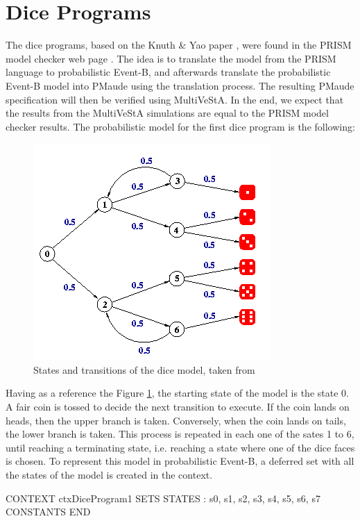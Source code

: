 \section{Dice Programs}
The dice programs, based on the Knuth \& Yao paper \cite{knuth}, were found in the PRISM model checker web page \cite{PRISMDICE}. The idea is to translate the model from the PRISM language to probabilistic Event-B, and afterwards translate the probabilistic Event-B model into PMaude using the translation process. The resulting PMaude specification will then be verified using MultiVeStA. In the end, we expect that the results from the MultiVeStA simulations are equal to the PRISM model checker results. The probabilistic model for the first dice program is the following:
\begin{figure}[H]
    \centering
    \includegraphics[scale = 0.5]{images/CS1.png}
    \caption{States and transitions of the dice model, taken from \cite{PRISMDICE}}
    \label{fig:ce1}
\end{figure}
Having as a reference the Figure \ref{fig:ce1}, the starting state of the model is the state 0. A fair coin is tossed to decide the next transition to execute. If the coin lands on heads, then the upper branch is taken. Conversely, when the coin lands on tails, the lower branch is taken. This process is repeated in each one of the sates 1 to 6, until reaching a terminating state, i.e. reaching a state where one of the dice faces is chosen. To represent this model in probabilistic Event-B, a deferred set with all the states of the model is created in the context.
\begin{maude}

CONTEXT ctxDiceProgram1
SETS 
    STATES : { s0, s1, s2, s3, s4, s5, s6, s7 }
CONSTANTS 
END
\end{maude}
